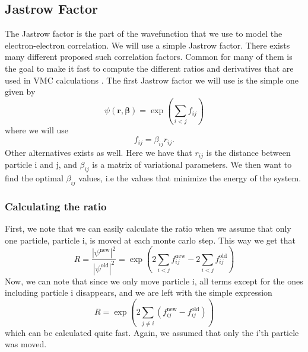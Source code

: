 \subsection{Jastrow Factor}
The Jastrow factor is the part of the wavefunction that we use to model the electron-electron correlation. We will use a simple Jastrow factor. There exists many different proposed such correlation factors. Common for many of them is the goal to make it fast to compute the different ratios and derivatives that are used in VMC calculations \cite{}. 
The first Jastrow factor we will use is the simple one given by
\begin{equation}
    \psi(\boldsymbol{r}, \boldsymbol{\beta}) = \exp\left(\sum_{i<j}f_{ij}\right)
\end{equation}
where we will use
\begin{equation}
    f_{ij} = \beta_{ij}r_{ij}.
\end{equation}
Other alternatives exists as well. 
Here we have that $r_{ij}$ is the distance between particle i and j, and $\beta_{ij}$ is a matrix of variational parameters. We then want to find the optimal $\beta_{ij}$ values, i.e the values that minimize the energy of the system. 
\subsubsection{Calculating the ratio}
First, we note that we can easily calculate the ratio when we assume that only one particle, particle i, is moved at each monte carlo step. This way we get that
\begin{equation}
    R = \frac{|\psi^{\text{new}}|^2}{|\psi^{\text{old}}|^2} = \exp\left(2\sum_{i<j} f_{ij}^\text{new} - 2\sum_{i<j} f_{ij}^\text{old}\right) 
\end{equation}
Now, we can note that since we only move particle i, all terms except for the ones including particle i disappears, and we are left with the simple expression
\begin{equation}
    R = \exp\left(2\sum_{j\neq i}(f_{ij}^\text{new} - f_{ij}^\text{old})\right) 
\end{equation}
which can be calculated quite fast. Again, we assumed that only the i'th particle was moved. 

